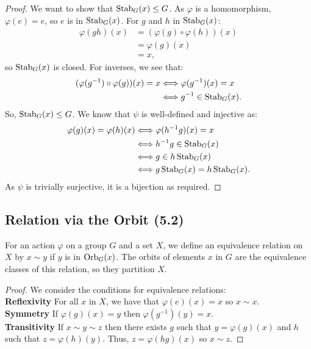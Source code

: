 \begin{proof}
    We want to show that $\operatorname{Stab}_G(x) \leq G$.
    As $\varphi$ is a homomorphism, $\varphi(e) = e$, so $e$ is
    in $\operatorname{Stab}_G(x)$. For $g$ and $h$ in $\operatorname{Stab}_G(x)$: \begin{align*}
        \varphi(gh)(x) 
        &= (\varphi(g) \circ \varphi(h))(x) \\
        &= \varphi(g)(x) \\
        &= x,
    \end{align*} so $\operatorname{Stab}_G(x)$ is closed. For inverses, we see that: \begin{align*}
        (\varphi(g^{-1}) \circ \varphi(g))(x) = x
        & \Longleftrightarrow \varphi(g^{-1})(x) = x \\
        & \Longleftrightarrow g^{-1} \in \operatorname{Stab}_G(x).
    \end{align*} So, $\operatorname{Stab}_G(x) \leq G$. We know that
    $\psi$ is well-defined and injective as: \begin{align*}
        \varphi(g)(x) = \varphi(h)(x)
        & \Longleftrightarrow \varphi(h^{-1}g)(x) = x \\
        & \Longleftrightarrow h^{-1}g \in \operatorname{Stab}_G(x) \\
        & \Longleftrightarrow g \in h\operatorname{Stab}_G(x) \\
        & \Longleftrightarrow g\operatorname{Stab}_G(x) = h\operatorname{Stab}_G(x).
    \end{align*} As $\psi$ is trivially surjective, it is a bijection as required.
\end{proof}

\subsection{Relation via the Orbit (5.2)} \label{5.2}

For an action $\varphi$ on a group $G$ and a set $X$, we define an equivalence relation
on $X$ by $x \sim y$ if $y$ is in $\operatorname{Orb}_G(x)$. The orbits of elements
$x$ in $G$ are the equivalence classes of this relation, so they partition $X$.

\begin{proof} We consider the conditions for equivalence relations: 
    \\[\baselineskip]
    \textbf{Reflexivity} For all $x$ in $X$, we have that $\varphi(e)(x) = x$ so $x \sim x$. 
    \\[\baselineskip]
    \textbf{Symmetry} If $\varphi(g)(x) = y$ then $\varphi(g^{-1})(y) = x$. 
    \\[\baselineskip]
    \textbf{Transitivity} If $x \sim y \sim z$ then there exists
    $g$ such that $y = \varphi(g)(x)$ and $h$ such that $z = \varphi(h)(y)$.
    Thus, $z = \varphi(hg)(x)$ so $x \sim z$.
\end{proof}

